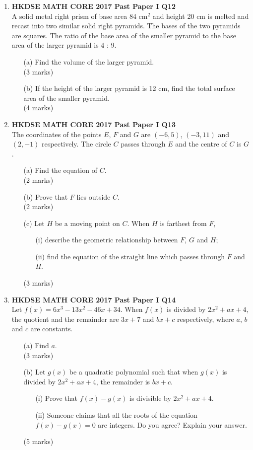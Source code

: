 \documentclass[12pt]{article}
\begin{document}
\begin{enumerate}
	\item \textbf{HKDSE MATH CORE 2017 Past Paper I Q12}\\
	A solid metal right prism of base area 84 cm$^2$ and height 20 cm is melted and recast into two similar solid right pyramids. The bases of the two pyramids are squares. The ratio of the base area of the smaller pyramid to the base area of the larger pyramid is 4 : 9.
	\begin{enumerate}
		\item[(a)] Find the volume of the larger pyramid. \\(3 marks)
		\item[(b)] If the height of the larger pyramid is 12 cm, find the total surface area of the smaller pyramid. \\(4 marks)
	\end{enumerate}

	\item \textbf{HKDSE MATH CORE 2017 Past Paper I Q13}\\
	The coordinates of the points $E$, $F$ and $G$ are $(-6, 5)$, $(-3, 11)$ and $(2, -1)$ respectively. The circle $C$ passes through $E$ and the centre of $C$ is $G$.
	\begin{enumerate}
		\item[(a)] Find the equation of $C$. \\(2 marks)
		\item[(b)] Prove that $F$ lies outside $C$. \\(2 marks)
		\item[(c)] Let $H$ be a moving point on $C$. When $H$ is farthest from $F$,
		\begin{enumerate}
			\item[(i)] describe the geometric relationship between $F$, $G$ and $H$;
			\item[(ii)] find the equation of the straight line which passes through $F$ and $H$.
		\end{enumerate}
		(3 marks)
	\end{enumerate}

	\item \textbf{HKDSE MATH CORE 2017 Past Paper I Q14}\\
	Let $f(x) = 6x^3 - 13x^2 - 46x + 34$. When $f(x)$ is divided by $2x^2 + ax + 4$, the quotient and the remainder are $3x + 7$ and $bx + c$ respectively, where $a$, $b$ and $c$ are constants.
	\begin{enumerate}
		\item[(a)] Find $a$. \\(3 marks)
		\item[(b)] Let $g(x)$ be a quadratic polynomial such that when $g(x)$ is divided by $2x^2 + ax + 4$, the remainder is $bx + c$.
		\begin{enumerate}
			\item[(i)] Prove that  $f(x) - g(x)$ is divisible by $2x^2 + ax + 4$.
			\item[(ii)] Someone claims that all the roots of the equation  $f(x) - g(x) = 0$ are integers. Do you agree? Explain your answer.
		\end{enumerate}
		(5 marks)
	\end{enumerate}


\end{enumerate}
\end{document}
